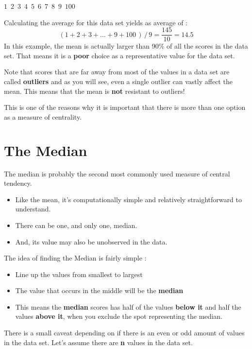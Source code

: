 \documentclass[
  letterpaper,
  DIV=11,
  numbers=noendperiod]{scrreprt}
\begin{document}
\(1 \,\,\,2 \,\,\,3\,\,\,4\,\,\,5\,\,\,6\,\,\,7\,\,\,8\,\,\,9\,\,\,100\)

Calculating the average for this data set yields as average of :
\[(1 + 2 + 3 + \dots +9+100\,)\,/\,9 = \frac{145}{10} = 14.5\] In this
example, the mean is actually larger than 90\% of all the scores in the
data set. That means it is a \textbf{poor} choice as a representative
value for the data set.

Note that scores that are far away from most of the values in a data set
are called \textbf{outliers} and as you will see, even a single outlier
can vastly affect the mean. This means that the mean is \textbf{not}
resistant to outliers!

This is one of the reasons why it is important that there is more than
one option as a measure of centrality.

\section*{The Median}\label{the-median}


The median is probably the second most commonly used measure of central
tendency.

\begin{itemize}
\item
  Like the mean, it's computationally simple and relatively
  straightforward to understand.
\item
  There can be one, and only one, median.
\item
  And, its value may also be unobserved in the data.
\end{itemize}

The idea of finding the Median is fairly simple :

\begin{itemize}
\item
  Line up the values from smallest to largest
\item
  The value that occurs in the middle will be the \textbf{median}
\item
  This means the \textbf{median} scores has half of the values
  \textbf{below it} and half the values \textbf{above it}, when you
  exclude the spot representing the median.
\end{itemize}

There is a small caveat depending on if there is an even or odd amount
of values in the data set. Let's assume there are \textbf{n} values in
the data set.
\end{document}
